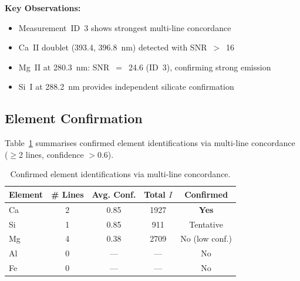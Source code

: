 \documentclass[a4paper,twocolumn,10pt]{article}
\begin{document}
\textbf{Key Observations:}
\begin{itemize}[nosep,leftmargin=*]
  \item Measurement~ID~3 shows strongest multi-line concordance
  \item Ca~II doublet (393.4, 396.8~nm) detected with SNR~$>$~16
  \item Mg~II at 280.3~nm: SNR~$=$~24.6 (ID~3), confirming strong emission
  \item Si~I at 288.2~nm provides independent silicate confirmation
\end{itemize}

\subsection{Element Confirmation}

Table~\ref{tab:element_confirmation} summarises confirmed element
identifications via multi-line concordance ($\geq$2 lines, confidence
$>$0.6).

\begin{table}[htbp]
\centering
\caption{Confirmed element identifications via multi-line concordance.}
\label{tab:element_confirmation}
{\small
\begin{tabularx}{\columnwidth}{@{}lcccc@{}}
\toprule
\textbf{Element} & \textbf{\# Lines} & \textbf{Avg. Conf.} &
  \textbf{Total $I$} & \textbf{Confirmed} \\
\midrule
Ca & 2 & 0.85 & 1927 & \textbf{Yes} \\
Si & 1 & 0.85 & 911  & Tentative \\
Mg & 4 & 0.38 & 2709 & No (low conf.) \\
Al & 0 & --- & ---  & No \\
Fe & 0 & --- & ---  & No \\
\bottomrule
\end{tabularx}
}
\end{table}
\end{document}
